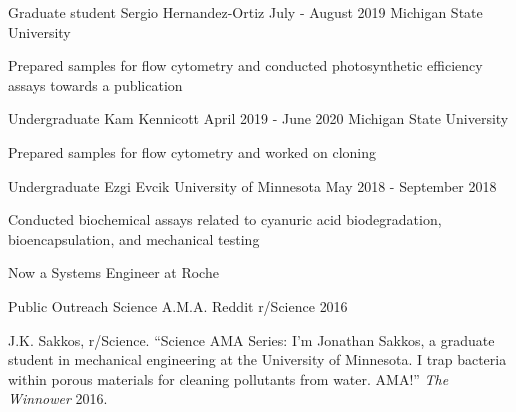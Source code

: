 \documentclass[11pt, letterpaper]{awesome-cv} %
\begin{document}
\begin{sloppypar}
\begin{cventries}
	\cventry
	{Graduate student}
	{Sergio Hernandez-Ortiz}
	{July - August 2019}
	{Michigan State University}
	{
		\begin{cvitems}
			\item {Prepared samples for flow cytometry and conducted photosynthetic efficiency assays towards a publication}
		\end{cvitems}		
}
	\cventry
	{Undergraduate}
	{Kam Kennicott}
	{April 2019 - June 2020}
	{Michigan State University}
	{
		\begin{cvitems}
			\item {Prepared samples for flow cytometry and worked on cloning}
		\end{cvitems}		
	}
	\cventry
	{Undergraduate}
	{Ezgi Evcik}
	{University of Minnesota}
	{May 2018 - September 2018}
	{
		\begin{cvitems}
			\item {Conducted biochemical assays related to cyanuric acid biodegradation, bioencapsulation, and mechanical testing}
			\item {Now a Systems Engineer at Roche}
		\end{cvitems}		
	}
	\cventry
	{Public Outreach}
	{Science A.M.A.}
	{Reddit r/Science}
	{2016}
	{
		\begin{cvitems}
			\item {J.K. Sakkos, r/Science. “Science AMA Series: I’m Jonathan Sakkos, a graduate student in mechanical engineering at the University of Minnesota. I trap bacteria within porous materials for cleaning pollutants from water. AMA!” \textit{The Winnower} 2016.}
		\end{cvitems}		
	}


\end{cventries}
\end{sloppypar}
\end{document}
